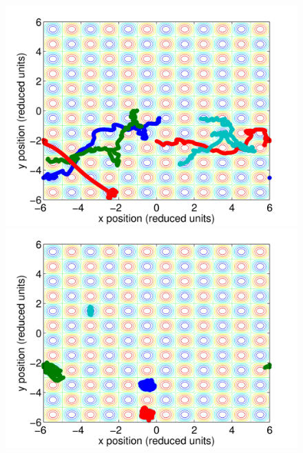 \documentclass[12pt, oneside]{article}
\begin{document}
\begin{figure}
\begin{minipage}[!htbp]{.5\linewidth}
\includegraphics[width=\textwidth]{./figs/ex2-4n-acon0p1-tin0p1-3e3.png}
\subcaption{}
\end{minipage}
\hspace{0.02\linewidth}
\begin{minipage}[!htbp]{.5\linewidth}
\includegraphics[width=\textwidth]{./figs/ex2-4n-acon1-tin0p1-3e3.png}
\subcaption{}
\end{minipage}
\hspace{0.02\linewidth}
\begin{minipage}[!htbp]{.5\linewidth}

\end{minipage}
\end{figure}
\end{document}
